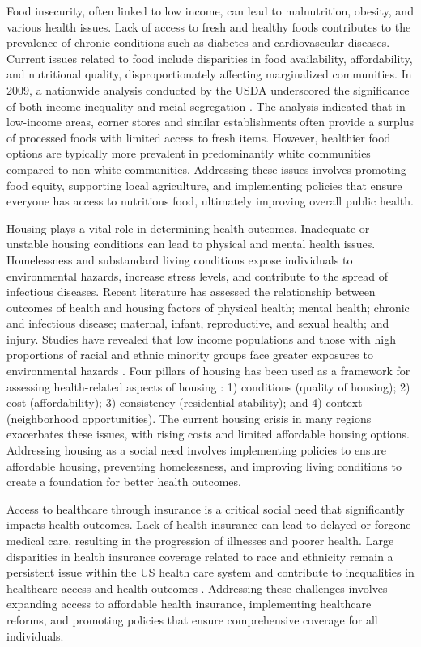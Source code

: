 \documentclass[12pt]{article}
\begin{document}
Food insecurity,
often linked to low income, can lead to
malnutrition, obesity, and various health
issues. Lack of access to fresh and
healthy foods contributes to the prevalence
of chronic conditions such as diabetes
and cardiovascular diseases. Current
issues related to food include disparities
in food availability, affordability, and
nutritional quality, disproportionately
affecting marginalized communities.
In 2009, a nationwide analysis conducted by the USDA underscored the significance of both income inequality and racial segregation \citep{USDA_ERS2009}.
The analysis indicated that in low-income areas, corner stores and similar establishments often provide 
a surplus of processed foods with limited access to fresh items. However, healthier food options are 
typically more prevalent in predominantly white communities compared to non-white communities.
Addressing these issues involves promoting
food equity, supporting local agriculture,
and implementing policies that ensure
everyone has access to nutritious food,
ultimately improving overall public health.

Housing plays a vital role in determining
health outcomes. Inadequate or unstable
housing conditions can lead to physical
and mental health issues. Homelessness
and substandard living conditions expose
individuals to environmental hazards,
increase stress levels, and contribute to the spread of infectious diseases.
Recent literature \citep{Taylor2018} has assessed the relationship between outcomes of health 
and housing factors of physical health; mental health; chronic and infectious disease; maternal,
 infant, reproductive, and sexual health; and injury. Studies have revealed that low income 
 populations and those with high proportions of racial and ethnic minority groups face greater exposures to environmental hazards 
 \citep{Taylor2018}.
Four pillars of housing has been used as a framework for assessing health-related aspects of 
housing \citep{Swope_Hernández_2019}: 1) conditions (quality of housing); 2) cost (affordability); 3) consistency (residential stability); 
and 4) context (neighborhood opportunities).
The current housing crisis in many regions
exacerbates these issues, with rising
costs and limited affordable housing
options. Addressing housing as a social
need involves implementing policies to
ensure affordable housing, preventing
homelessness, and improving living
conditions to create a foundation for
better health outcomes.

Access to healthcare through insurance
is a critical social need that significantly
impacts health outcomes. Lack of health
insurance can lead to delayed or forgone
medical care, resulting in the progression
of illnesses and poorer health. 
Large disparities in health insurance coverage related to race and ethnicity remain a persistent issue within the US health care system
and contribute
to inequalities in healthcare access and
health outcomes 
\citep{Buchmueller_Levinson_Levy_Wolfe_2016}.
Addressing these challenges
involves expanding access to affordable
health insurance, implementing healthcare
reforms, and promoting policies that
ensure comprehensive coverage for all
individuals.
\end{document}
